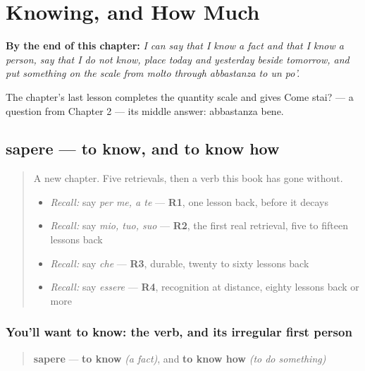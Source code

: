 
\chapter{Knowing, and How Much}
\label{ch:it-sapere}

\begin{chapteropening}
\textbf{By the end of this chapter:} \emph{I can say that I know a fact and that I know a person, say that I do not know, place today and yesterday beside tomorrow, and put something on the scale from molto through abbastanza to un po'.}

The chapter's last lesson completes the quantity scale and gives Come stai? — a question from Chapter 2 — its middle answer: abbastanza bene.
\end{chapteropening}

\section[sapere]{sapere — to know, and to know how}

\label{lesson:IT-C35-sapere}



\begin{quote}
A new chapter. Five retrievals, then a verb this book has gone without.

\begin{itemize}
\raggedright
  \item \emph{Recall:} say \emph{per me, a te} — \textbf{R1}, one lesson back, before it decays
  \item \emph{Recall:} say \emph{mio, tuo, suo} — \textbf{R2}, the first real retrieval, five to fifteen lessons back
  \item \emph{Recall:} say \emph{che} — \textbf{R3}, durable, twenty to sixty lessons back
  \item \emph{Recall:} say \emph{essere} — \textbf{R4}, recognition at distance, eighty lessons back or more
\end{itemize}
\end{quote}

\subsection*{You'll want to know: the verb, and its irregular first person}
\begin{quote}
\textbf{sapere} — \textbf{to know} \emph{(a fact)}, and \textbf{to know how} \emph{(to do something)}
\end{quote}

